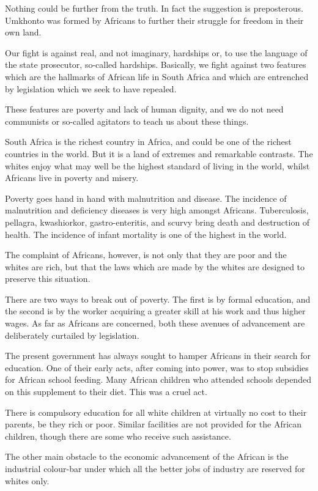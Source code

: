 \documentclass[11pt,a4paper]{article}
\begin{document}
Nothing could be further from the truth. In fact the suggestion is preposterous. Umkhonto
was formed by Africans to further their struggle for freedom in their own land.

Our fight is against real, and not imaginary, hardships or, to use the language of the state
prosecutor, so-called hardships. Basically, we fight against two features which are the
hallmarks of African life in South Africa and which are entrenched by legislation which we
seek to have repealed.

These features are poverty and lack of human dignity, and we do not need communists or
so-called agitators to teach us about these things.

South Africa is the richest country in Africa, and could be one of the richest countries in the
world. But it is a land of extremes and remarkable contrasts. The whites enjoy what may
well be the highest standard of living in the world, whilst Africans live in poverty and
misery.

Poverty goes hand in hand with malnutrition and disease. The incidence of malnutrition
and deficiency diseases is very high amongst Africans. Tuberculosis, pellagra,
kwashiorkor, gastro-enteritis, and scurvy bring death and destruction of health. The
incidence of infant mortality is one of the highest in the world.

The complaint of Africans, however, is not only that they are poor and the whites are rich,
but that the laws which are made by the whites are designed to preserve this situation.

There are two ways to break out of poverty. The first is by formal education, and the
second is by the worker acquiring a greater skill at his work and thus higher wages. As far
as Africans are concerned, both these avenues of advancement are deliberately curtailed
by legislation.

The present government has always sought to hamper Africans in their search for
education. One of their early acts, after coming into power, was to stop subsidies for
African school feeding. Many African children who attended schools depended on this
supplement to their diet. This was a cruel act.

There is compulsory education for all white children at virtually no cost to their parents, be
they rich or poor. Similar facilities are not provided for the African children, though there
are some who receive such assistance.

The other main obstacle to the economic advancement of the African is the industrial
colour-bar under which all the better jobs of industry are reserved for whites only.
\end{document}
